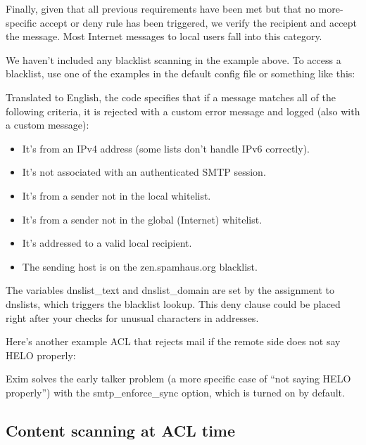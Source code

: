 
Finally, given that all previous requirements have been met but that no
more-{specific} {accept} or {deny} rule has been triggered, we verify
the recipient and accept the message. Most Internet messages to local
users fall into this category.

\protect\hypertarget{part0026_split_047.htmlux5cux23_idTextAnchor1141}{}{}We
haven't included any blacklist scanning in the example above. To access
a blacklist, use one of the examples in the default config file or
something like this:


Translated to English, the code specifies that if a message matches
{all} of the following criteria, it is rejected with a custom error
message and logged (also with a custom message):

\begin{itemize}
\item
  It's from an IPv4 address (some lists don't handle IPv6 correctly).
\item
  It's not associated with an authenticated SMTP session.
\item
  It's from a sender not in the local whitelist.
\item
  It's from a sender not in the global (Internet) whitelist.
\item
  It's addressed to a valid local recipient.
\item
  The sending host is on the zen.spamhaus.org blacklist.
\end{itemize}

The variables {dnslist\_text} and {dnslist\_domain} are set by the
assignment to {dnslists}, which triggers the blacklist lookup. This
{deny} clause could be placed right after your checks for unusual
characters in addresses.

Here's another example ACL that rejects mail if the remote side does not
say HELO properly:


Exim solves the early talker problem (a more specific case of ``not
saying HELO properly'') with the {smtp\_enforce\_sync} option, which is
turned on by default.

\protect\hypertarget{part0026_split_048.html}{}{}

\hypertarget{part0026_split_048.htmlux5cux23_idContainer1247}{}
\hypertarget{part0026_split_048.htmlux5cux23calibre_pb_47}{%
\subsection[Content scanning at ACL
time]{\texorpdfstring{\protect\hypertarget{part0026_split_048.htmlux5cux23_idTextAnchor1142}{}{}Con\protect\hypertarget{part0026_split_048.htmlux5cux23_idTextAnchor1143}{}{}tent
scanning at ACL
time}{Content scanning at ACL time}}\label{part0026_split_048.htmlux5cux23calibre_pb_47}}

